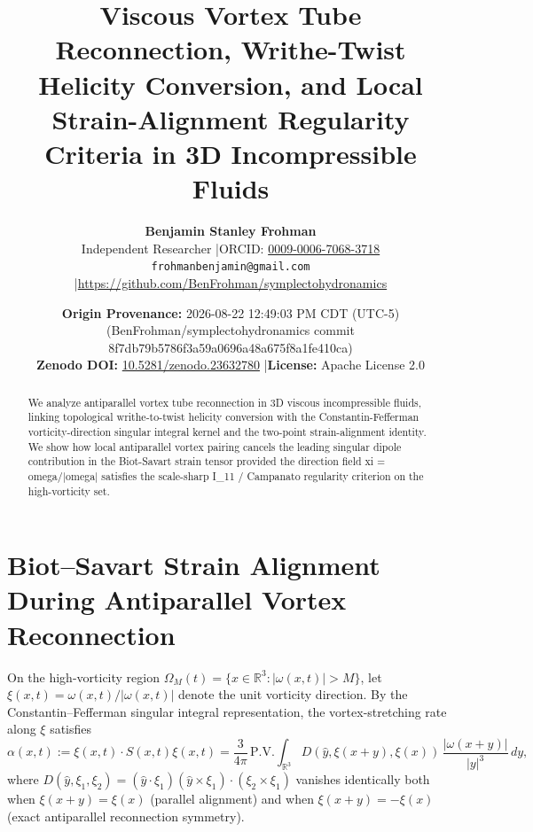 \documentclass[11pt,letterpaper]{article}
\title{\textbf{Viscous Vortex Tube Reconnection, Writhe-Twist Helicity Conversion, and Local Strain-Alignment Regularity Criteria in 3D Incompressible Fluids}}
\author{\textbf{Benjamin Stanley Frohman}\\
Independent Researcher \quad|\quad ORCID: \href{https://orcid.org/0009-0006-7068-3718}{0009-0006-7068-3718}\\
\texttt{frohmanbenjamin@gmail.com} \quad|\quad \url{https://github.com/BenFrohman/symplectohydronamics}}
\date{\textbf{Origin Provenance:} 2026-08-22 12:49:03 PM CDT (UTC-5) (BenFrohman/symplectohydronamics commit 8f7db79b5786f3a59a0696a48a675f8a1fe410ca)\\
\textbf{Zenodo DOI:} \href{https://doi.org/10.5281/zenodo.23632780}{10.5281/zenodo.23632780} \quad|\quad \textbf{License:} Apache License 2.0}
\begin{document}
\maketitle

\begin{center}
\end{center}

\begin{abstract}
\noindent We analyze antiparallel vortex tube reconnection in 3D viscous incompressible fluids, linking topological writhe-to-twist helicity conversion with the Constantin-Fefferman vorticity-direction singular integral kernel and the two-point strain-alignment identity. We show how local antiparallel vortex pairing cancels the leading singular dipole contribution in the Biot-Savart strain tensor provided the direction field xi = omega/|omega| satisfies the scale-sharp I\_11 / Campanato regularity criterion on the high-vorticity set.
\end{abstract}


\section{Biot--Savart Strain Alignment During Antiparallel Vortex Reconnection}
On the high-vorticity region $\Omega_M(t) = \{x \in \mathbb{R}^3 : |\omega(x,t)| > M\}$, let $\xi(x,t) = \omega(x,t)/|\omega(x,t)|$ denote the unit vorticity direction. By the Constantin--Fefferman singular integral representation, the vortex-stretching rate along $\xi$ satisfies
\begin{equation}
\alpha(x,t) := \xi(x,t) \cdot S(x,t)\xi(x,t) = \frac{3}{4\pi}\,\mathrm{P.V.}\int_{\mathbb{R}^3} D(\hat{y}, \xi(x+y), \xi(x))\,\frac{|\omega(x+y)|}{|y|^3}\,dy,
\end{equation}
where $D(\hat{y}, \xi_1, \xi_2) = (\hat{y} \cdot \xi_1)(\hat{y} \times \xi_1) \cdot (\xi_2 \times \xi_1)$ vanishes identically both when $\xi(x+y) = \xi(x)$ (parallel alignment) and when $\xi(x+y) = -\xi(x)$ (exact antiparallel reconnection symmetry).
\end{document}
